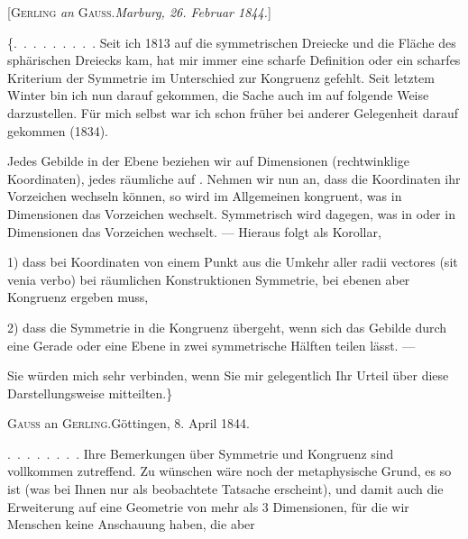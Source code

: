 %
\begin{center}
[\textsc{Gerling} \emph{an} \textsc{Gauss}.\quad \emph{Marburg, 26. Februar 1844.}]
\end{center}

\{\mbox{.\ .\ .\ .\ .\ .\ .\ .\ .} Seit ich 1813 auf die symmetrischen Dreiecke und die Fläche des sphärischen Dreiecks kam, hat mir immer eine scharfe Definition oder ein scharfes Kriterium der Symmetrie im Unterschied zur Kongruenz gefehlt. Seit letztem Winter bin ich nun darauf gekommen, die Sache auch im  auf folgende Weise darzustellen. Für mich selbst war ich schon früher bei anderer Gelegenheit darauf gekommen (1834).

Jedes Gebilde in der Ebene beziehen wir auf  Dimensionen (rechtwinklige Koordinaten), jedes räumliche auf . Nehmen wir nun an, dass die Koordinaten ihr Vorzeichen wechseln können, so wird im Allgemeinen kongruent, was in  Dimensionen das Vorzeichen wechselt. Symmetrisch wird dagegen, was in  oder in  Dimensionen das Vorzeichen wechselt. --- Hieraus folgt als Korollar,

1) dass bei Koordinaten von einem Punkt aus die Umkehr aller radii vectores (sit venia verbo) bei räumlichen Konstruktionen Symmetrie, bei ebenen aber Kongruenz ergeben muss,

2) dass die Symmetrie in die Kongruenz übergeht, wenn sich das Gebilde durch eine Gerade oder eine Ebene in zwei symmetrische Hälften teilen lässt. ---

Sie würden mich sehr verbinden, wenn Sie mir gelegentlich Ihr Urteil über diese Darstellungsweise mitteilten.\}

\par\bigskip

\begin{center}
\textsc{Gauss} an \textsc{Gerling}.\quad Göttingen, 8. April 1844.
\end{center}

\mbox{.\ .\ .\ .\ .\ .\ .\ .} Ihre Bemerkungen über Symmetrie und Kongruenz sind vollkommen zutreffend. Zu wünschen wäre noch der metaphysische Grund,  es so ist (was bei Ihnen nur als beobachtete Tatsache erscheint), und damit auch die Erweiterung auf eine Geometrie von mehr als 3 Dimensionen, für die wir Menschen keine Anschauung haben, die aber\space%
